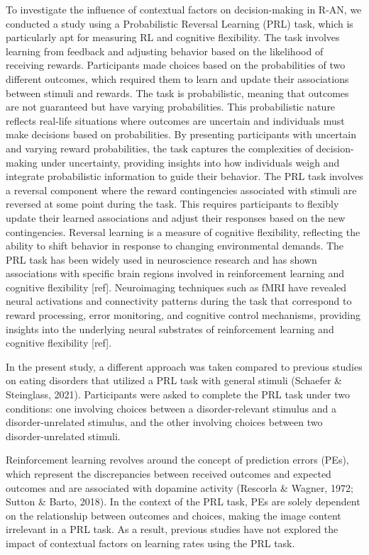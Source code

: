 \documentclass[
  man,floatsintext]{apa6}
\begin{document}
To investigate the influence of contextual factors on decision-making in R-AN, we conducted a study using a Probabilistic Reversal Learning (PRL) task, which is particularly apt for measuring RL and cognitive flexibility. The task involves learning from feedback and adjusting behavior based on the likelihood of receiving rewards. Participants made choices based on the probabilities of two different outcomes, which required them to learn and update their associations between stimuli and rewards. The task is probabilistic, meaning that outcomes are not guaranteed but have varying probabilities. This probabilistic nature reflects real-life situations where outcomes are uncertain and individuals must make decisions based on probabilities. By presenting participants with uncertain and varying reward probabilities, the task captures the complexities of decision-making under uncertainty, providing insights into how individuals weigh and integrate probabilistic information to guide their behavior. The PRL task involves a reversal component where the reward contingencies associated with stimuli are reversed at some point during the task. This requires participants to flexibly update their learned associations and adjust their responses based on the new contingencies. Reversal learning is a measure of cognitive flexibility, reflecting the ability to shift behavior in response to changing environmental demands. The PRL task has been widely used in neuroscience research and has shown associations with specific brain regions involved in reinforcement learning and cognitive flexibility {[}ref{]}. Neuroimaging techniques such as fMRI have revealed neural activations and connectivity patterns during the task that correspond to reward processing, error monitoring, and cognitive control mechanisms, providing insights into the underlying neural substrates of reinforcement learning and cognitive flexibility {[}ref{]}.

In the present study, a different approach was taken compared to previous studies on eating disorders that utilized a PRL task with general stimuli (Schaefer \& Steinglass, 2021). Participants were asked to complete the PRL task under two conditions: one involving choices between a disorder-relevant stimulus and a disorder-unrelated stimulus, and the other involving choices between two disorder-unrelated stimuli.

Reinforcement learning revolves around the concept of prediction errors (PEs), which represent the discrepancies between received outcomes and expected outcomes and are associated with dopamine activity (Rescorla \& Wagner, 1972; Sutton \& Barto, 2018). In the context of the PRL task, PEs are solely dependent on the relationship between outcomes and choices, making the image content irrelevant in a PRL task. As a result, previous studies have not explored the impact of contextual factors on learning rates using the PRL task.
\end{document}
